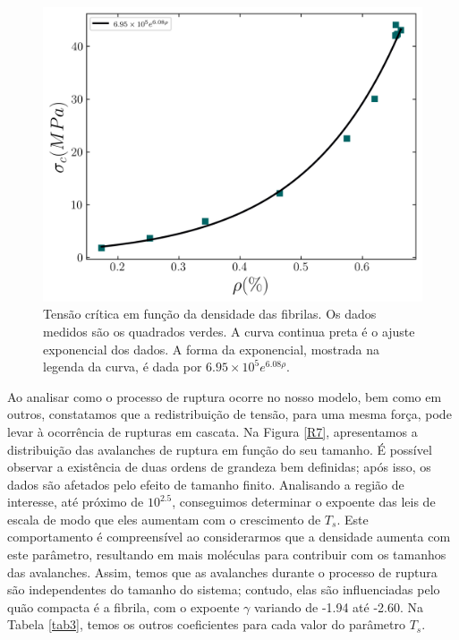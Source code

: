 \documentclass{article}
\begin{document}
    \begin{figure}[H]
        \centering
        \includegraphics[width=\textwidth]{figures/sigma_rho.png}

        \caption{Tensão crítica em função da densidade das fibrilas. Os dados medidos são os quadrados verdes. A curva 
        continua preta é o ajuste exponencial dos dados. A forma da exponencial, mostrada na legenda da curva, é dada 
        por \(6.95 \times 10^{5}e^{6.08\rho}\).} 


        \label{R6}
    \end{figure}

    Ao analisar como o processo de ruptura ocorre no nosso modelo, bem como em outros, constatamos que a 
    redistribuição de tensão, para uma mesma força, pode levar à ocorrência de rupturas em cascata. Na Figura 
    \ref{R7}, apresentamos a distribuição das avalanches de ruptura em função do seu tamanho. É possível observar a 
    existência de duas ordens de grandeza bem definidas; após isso, os dados são afetados pelo efeito de tamanho 
    finito. Analisando a região de interesse, até próximo de \(10^{2.5}\), conseguimos determinar o expoente das leis 
    de escala de modo que eles aumentam com o crescimento de \(T_{s}\). Este comportamento é compreensível ao 
    considerarmos que a densidade aumenta com este parâmetro, resultando em mais moléculas para contribuir com os 
    tamanhos das avalanches. Assim, temos que as avalanches durante o processo de ruptura são independentes do tamanho 
    do sistema; contudo, elas são influenciadas pelo quão compacta é a fibrila, com o expoente \(\gamma\) variando de 
    -1.94 até -2.60. Na Tabela \ref{tab3}, temos os outros coeficientes para cada valor do parâmetro \(T_{s}\).
    
\end{document}
